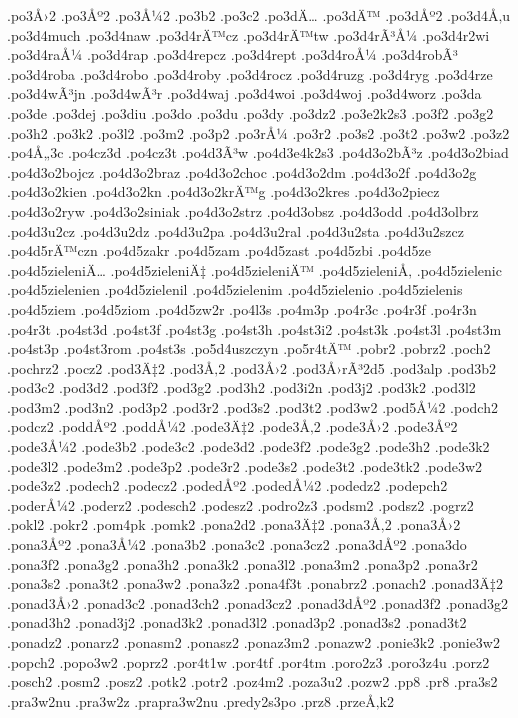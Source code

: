 {.po3Å›2
.po3Åº2
.po3Å¼2
.po3b2
.po3c2
.po3dÄ…
.po3dÄ™
.po3dÅº2
.po3d4Å‚u
.po3d4much
.po3d4naw
.po3d4rÄ™cz
.po3d4rÄ™tw
.po3d4rÃ³Å¼
.po3d4r2wi
.po3d4raÅ¼
.po3d4rap
.po3d4repcz
.po3d4rept
.po3d4roÅ¼
.po3d4robÃ³
.po3d4roba
.po3d4robo
.po3d4roby
.po3d4rocz
.po3d4ruzg
.po3d4ryg
.po3d4rze
.po3d4wÃ³jn
.po3d4wÃ³r
.po3d4waj
.po3d4woi
.po3d4woj
.po3d4worz
.po3da
.po3de
.po3dej
.po3diu
.po3do
.po3du
.po3dy
.po3dz2
.po3e2k2s3
.po3f2
.po3g2
.po3h2
.po3k2
.po3l2
.po3m2
.po3p2
.po3rÅ¼
.po3r2
.po3s2
.po3t2
.po3w2
.po3z2
.po4Å„3c
.po4cz3d
.po4cz3t
.po4d3Ã³w
.po4d3e4k2s3
.po4d3o2bÃ³z
.po4d3o2biad
.po4d3o2bojcz
.po4d3o2braz
.po4d3o2choc
.po4d3o2dm
.po4d3o2f
.po4d3o2g
.po4d3o2kien
.po4d3o2kn
.po4d3o2krÄ™g
.po4d3o2kres
.po4d3o2piecz
.po4d3o2ryw
.po4d3o2siniak
.po4d3o2strz
.po4d3obsz
.po4d3odd
.po4d3olbrz
.po4d3u2cz
.po4d3u2dz
.po4d3u2pa
.po4d3u2ral
.po4d3u2sta
.po4d3u2szcz
.po4d5rÄ™czn
.po4d5zakr
.po4d5zam
.po4d5zast
.po4d5zbi
.po4d5ze
.po4d5zieleniÄ…
.po4d5zieleniÄ‡
.po4d5zieleniÄ™
.po4d5zieleniÅ‚
.po4d5zielenic
.po4d5zielenien
.po4d5zielenil
.po4d5zielenim
.po4d5zielenio
.po4d5zielenis
.po4d5ziem
.po4d5ziom
.po4d5zw2r
.po4l3s
.po4m3p
.po4r3c
.po4r3f
.po4r3n
.po4r3t
.po4st3d
.po4st3f
.po4st3g
.po4st3h
.po4st3i2
.po4st3k
.po4st3l
.po4st3m
.po4st3p
.po4st3rom
.po4st3s
.po5d4uszczyn
.po5r4tÄ™
.pobr2
.pobrz2
.poch2
.pochrz2
.pocz2
.pod3Ä‡2
.pod3Å‚2
.pod3Å›2
.pod3Å›rÃ³2d5
.pod3alp
.pod3b2
.pod3c2
.pod3d2
.pod3f2
.pod3g2
.pod3h2
.pod3i2n
.pod3j2
.pod3k2
.pod3l2
.pod3m2
.pod3n2
.pod3p2
.pod3r2
.pod3s2
.pod3t2
.pod3w2
.pod5Å¼2
.podch2
.podcz2
.poddÅº2
.poddÅ¼2
.pode3Ä‡2
.pode3Å‚2
.pode3Å›2
.pode3Åº2
.pode3Å¼2
.pode3b2
.pode3c2
.pode3d2
.pode3f2
.pode3g2
.pode3h2
.pode3k2
.pode3l2
.pode3m2
.pode3p2
.pode3r2
.pode3s2
.pode3t2
.pode3tk2
.pode3w2
.pode3z2
.podech2
.podecz2
.podedÅº2
.podedÅ¼2
.podedz2
.podepch2
.poderÅ¼2
.poderz2
.podesch2
.podesz2
.podro2z3
.podsm2
.podsz2
.pogrz2
.pokl2
.pokr2
.pom4pk
.pomk2
.pona2d2
.pona3Ä‡2
.pona3Å‚2
.pona3Å›2
.pona3Åº2
.pona3Å¼2
.pona3b2
.pona3c2
.pona3cz2
.pona3dÅº2
.pona3do
.pona3f2
.pona3g2
.pona3h2
.pona3k2
.pona3l2
.pona3m2
.pona3p2
.pona3r2
.pona3s2
.pona3t2
.pona3w2
.pona3z2
.pona4f3t
.ponabrz2
.ponach2
.ponad3Ä‡2
.ponad3Å›2
.ponad3c2
.ponad3ch2
.ponad3cz2
.ponad3dÅº2
.ponad3f2
.ponad3g2
.ponad3h2
.ponad3j2
.ponad3k2
.ponad3l2
.ponad3p2
.ponad3s2
.ponad3t2
.ponadz2
.ponarz2
.ponasm2
.ponasz2
.ponaz3m2
.ponazw2
.ponie3k2
.ponie3w2
.popch2
.popo3w2
.poprz2
.por4t1w
.por4tf
.por4tm
.poro2z3
.poro3z4u
.porz2
.posch2
.posm2
.posz2
.potk2
.potr2
.poz4m2
.poza3u2
.pozw2
.pp8
.pr8
.pra3s2
.pra3w2nu
.pra3w2z
.prapra3w2nu
.predy2s3po
.prz8
.przeÅ‚k2
}

